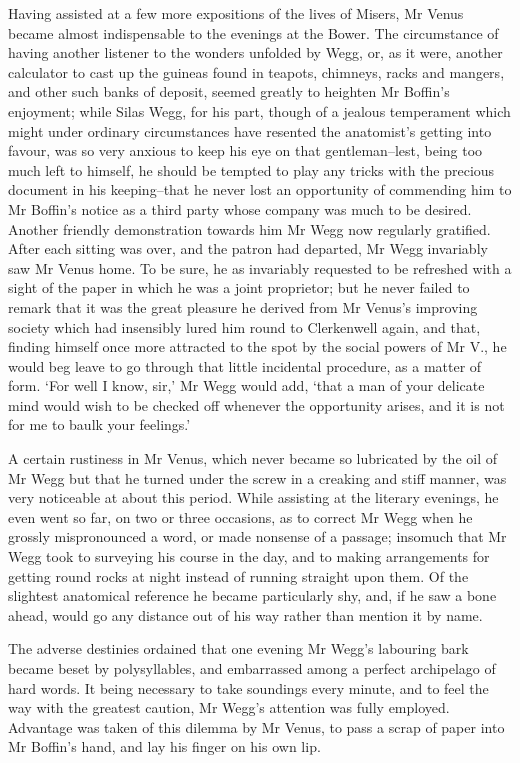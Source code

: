 Having assisted at a few more expositions of the lives of Misers, Mr
Venus became almost indispensable to the evenings at the Bower. The
circumstance of having another listener to the wonders unfolded by
Wegg, or, as it were, another calculator to cast up the guineas found in
teapots, chimneys, racks and mangers, and other such banks of deposit,
seemed greatly to heighten Mr Boffin’s enjoyment; while Silas Wegg, for
his part, though of a jealous temperament which might under ordinary
circumstances have resented the anatomist’s getting into favour, was
so very anxious to keep his eye on that gentleman--lest, being too
much left to himself, he should be tempted to play any tricks with the
precious document in his keeping--that he never lost an opportunity of
commending him to Mr Boffin’s notice as a third party whose company was
much to be desired. Another friendly demonstration towards him Mr Wegg
now regularly gratified. After each sitting was over, and the patron
had departed, Mr Wegg invariably saw Mr Venus home. To be sure, he as
invariably requested to be refreshed with a sight of the paper in which
he was a joint proprietor; but he never failed to remark that it was the
great pleasure he derived from Mr Venus’s improving society which had
insensibly lured him round to Clerkenwell again, and that, finding
himself once more attracted to the spot by the social powers of Mr V.,
he would beg leave to go through that little incidental procedure, as a
matter of form. ‘For well I know, sir,’ Mr Wegg would add, ‘that a
man of your delicate mind would wish to be checked off whenever the
opportunity arises, and it is not for me to baulk your feelings.’

A certain rustiness in Mr Venus, which never became so lubricated by
the oil of Mr Wegg but that he turned under the screw in a creaking and
stiff manner, was very noticeable at about this period. While assisting
at the literary evenings, he even went so far, on two or three
occasions, as to correct Mr Wegg when he grossly mispronounced a word,
or made nonsense of a passage; insomuch that Mr Wegg took to surveying
his course in the day, and to making arrangements for getting round
rocks at night instead of running straight upon them. Of the slightest
anatomical reference he became particularly shy, and, if he saw a bone
ahead, would go any distance out of his way rather than mention it by
name.

The adverse destinies ordained that one evening Mr Wegg’s labouring
bark became beset by polysyllables, and embarrassed among a perfect
archipelago of hard words. It being necessary to take soundings every
minute, and to feel the way with the greatest caution, Mr Wegg’s
attention was fully employed. Advantage was taken of this dilemma by
Mr Venus, to pass a scrap of paper into Mr Boffin’s hand, and lay his
finger on his own lip.

